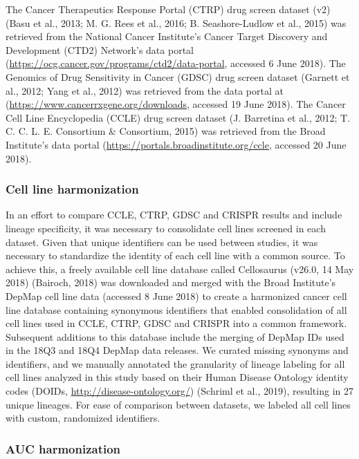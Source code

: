 \documentclass[man,floatsintext]{apa6}
\begin{document}
The Cancer Therapeutics Response Portal (CTRP) drug screen dataset (v2)
(Basu et al., 2013; M. G. Rees et al., 2016; B. Seashore-Ludlow et al.,
2015) was retrieved from the National Cancer Institute's Cancer Target
Discovery and Development (CTD2) Network's data portal
(\url{https://ocg.cancer.gov/programs/ctd2/data-portal}, accessed 6 June
2018). The Genomics of Drug Sensitivity in Cancer (GDSC) drug screen
dataset (Garnett et al., 2012; Yang et al., 2012) was retrieved from the
data portal at (\url{https://www.cancerrxgene.org/downloads}, accessed
19 June 2018). The Cancer Cell Line Encyclopedia (CCLE) drug screen
dataset (J. Barretina et al., 2012; T. C. C. L. E. Consortium \&
Consortium, 2015) was retrieved from the Broad Institute's data portal
(\url{https://portals.broadinstitute.org/ccle}, accessed 20 June 2018).

\subsubsection{Cell line harmonization}\label{cell-line-harmonization}

In an effort to compare CCLE, CTRP, GDSC and CRISPR results and include
lineage specificity, it was necessary to consolidate cell lines screened
in each dataset. Given that unique identifiers can be used between
studies, it was necessary to standardize the identity of each cell line
with a common source. To achieve this, a freely available cell line
database called Cellosaurus (v26.0, 14 May 2018) (Bairoch, 2018) was
downloaded and merged with the Broad Institute's DepMap cell line data
(accessed 8 June 2018) to create a harmonized cancer cell line database
containing synonymous identifiers that enabled consolidation of all cell
lines used in CCLE, CTRP, GDSC and CRISPR into a common framework.
Subsequent additions to this database include the merging of DepMap IDs
used in the 18Q3 and 18Q4 DepMap data releases. We curated missing
synonyms and identifiers, and we manually annotated the granularity of
lineage labeling for all cell lines analyzed in this study based on
their Human Disease Ontology identity codes (DOIDs,
\url{http://disease-ontology.org/}) (Schriml et al., 2019), resulting in
27 unique lineages. For ease of comparison between datasets, we labeled
all cell lines with custom, randomized identifiers.

\subsubsection{AUC harmonization}\label{auc-harmonization}
\end{document}

